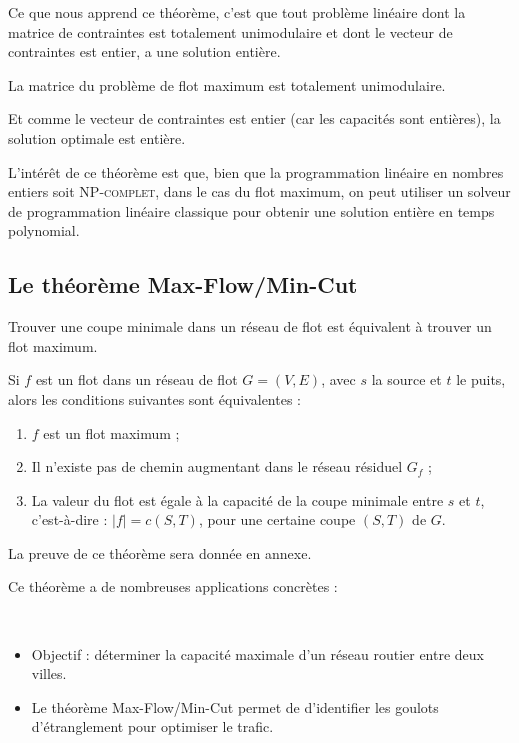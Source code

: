 \documentclass[a4paper]{article}
\begin{document}
Ce que nous apprend ce théorème, c'est que tout problème linéaire dont la matrice de contraintes est totalement unimodulaire et dont le vecteur de contraintes est entier, a une solution entière.
\begin{theorem}
La matrice du problème de flot maximum est totalement unimodulaire.
\end{theorem}
Et comme le vecteur de contraintes est entier (car les capacités sont entières), la solution optimale est entière.

L'intérêt de ce théorème est que, bien que la programmation linéaire en nombres entiers soit \textsc{NP-complet}, dans le cas du flot maximum, on peut utiliser un solveur de programmation linéaire classique pour obtenir une solution entière en temps polynomial.
\subsection{Le théorème Max-Flow/Min-Cut}
Trouver une coupe minimale dans un réseau de flot est équivalent à trouver un flot maximum.
\begin{theorem}
	Si $f$ est un flot dans un réseau de flot $G = (V, E)$, avec $s$ la source et $t$ le puits, alors les conditions suivantes sont équivalentes :
	\begin{enumerate}
		\item $f$ est un flot maximum ;
		\item Il n'existe pas de chemin augmentant dans le réseau résiduel $G_f$ ;
		\item La valeur du flot est égale à la capacité de la coupe minimale entre $s$ et $t$, c'est-à-dire : $|f| = c(S, T)$, pour une certaine coupe $(S, T)$ de $G$.
	\end{enumerate}
\end{theorem}
La preuve de ce théorème sera donnée en annexe.

Ce théorème a de nombreuses applications concrètes :
\begin{eg}\,

	\begin{itemize}[label={\color{gray}\small \textbullet}]
		\item Objectif : déterminer la capacité maximale d'un réseau routier entre deux villes.
		\item Le théorème Max-Flow/Min-Cut permet de d'identifier les goulots d'étranglement pour optimiser le trafic.
	\end{itemize}
\end{eg}
\end{document}
